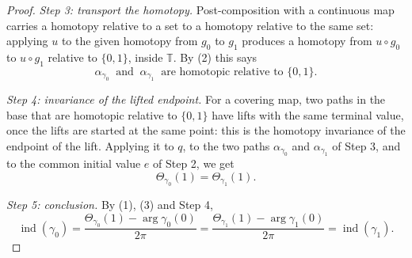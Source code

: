 \begin{proof}
\emph{Step 3: transport the homotopy.}  Post-composition with a continuous map
carries a homotopy relative to a set to a homotopy relative to the same set:
applying $u$ to the given homotopy from $g_0$ to $g_1$ produces a homotopy from
$u\circ g_0$ to $u\circ g_1$ relative to $\{0,1\}$, inside $\mathbb{T}$.  By
(2) this says
\[
  \alpha_{\gamma_0}\ \text{ and }\ \alpha_{\gamma_1}\ \text{ are homotopic relative to }\{0,1\}.
\]

\emph{Step 4: invariance of the lifted endpoint.}  For a covering map, two
paths in the base that are homotopic relative to $\{0,1\}$ have lifts with the
same terminal value, once the lifts are started at the same point: this is the
homotopy invariance of the endpoint of the lift.  Applying it to $q$, to the
two paths $\alpha_{\gamma_0}$ and $\alpha_{\gamma_1}$ of Step 3, and to the
common initial value $e$ of Step 2, we get
\[
  \Theta_{\gamma_0}(1)=\Theta_{\gamma_1}(1).
\]

\emph{Step 5: conclusion.}  By (1), (3) and Step 4,
\[
  \operatorname{ind}(\gamma_0)=\frac{\Theta_{\gamma_0}(1)-\arg\gamma_0(0)}{2\pi}
  =\frac{\Theta_{\gamma_1}(1)-\arg\gamma_1(0)}{2\pi}=\operatorname{ind}(\gamma_1).
\]
\end{proof}
